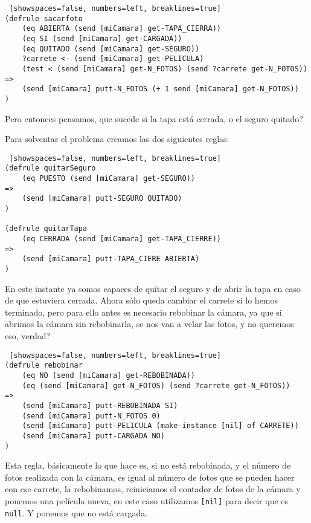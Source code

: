 \documentclass[hidelinks]{scrreprt}
\begin{document}
\begin{lstlisting} [showspaces=false, numbers=left, breaklines=true]
(defrule sacarfoto
    (eq ABIERTA (send [miCamara] get-TAPA_CIERRA))
    (eq SI (send [miCamara] get-CARGADA))
    (eq QUITADO (send [miCamara] get-SEGURO))
    ?carrete <- (send [miCamara] get-PELICULA)
    (test < (send [miCamara] get-N_FOTOS) (send ?carrete get-N_FOTOS))
=>
    (send [miCamara] putt-N_FOTOS (+ 1 send [miCamara] get-N_FOTOS))
)
\end{lstlisting}

Pero entonces pensamos, \textquestiondown que sucede si la tapa est\'{a} cerrada, o el seguro quitado?

Para solventar el problema creamos las dos siguientes reglas:
\begin{lstlisting} [showspaces=false, numbers=left, breaklines=true]
(defrule quitarSeguro
    (eq PUESTO (send [miCamara] get-SEGURO))
=>
    (send [miCamara] putt-SEGURO QUITADO)
)

(defrule quitarTapa
    (eq CERRADA (send [miCamara] get-TAPA_CIERRE))
=>
    (send [miCamara] putt-TAPA_CIERE ABIERTA)
)
\end{lstlisting}

En este instante ya somos capaces de quitar el seguro y de abrir la tapa en caso de que estuviera cerrada.
Ahora s\'{o}lo queda cambiar el carrete si lo hemos terminado, pero para ello antes es necesario rebobinar la
c\'{a}mara, ya que si abrimos la c\'{a}mara sin rebobinarla, se nos van a velar las fotos, y no queremos eso,
\textquestiondown verdad?


\begin{lstlisting} [showspaces=false, numbers=left, breaklines=true]
(defrule rebobinar
    (eq NO (send [miCamara] get-REBOBINADA))
    (eq (send [miCamara] get-N_FOTOS) (send ?carrete get-N_FOTOS))
=>
    (send [miCamara] putt-REBOBINADA SI)
    (send [miCamara] putt-N_FOTOS 0)
    (send [miCamara] putt-PELICULA (make-instance [nil] of CARRETE))
    (send [miCamara] putt-CARGADA NO)
)
\end{lstlisting}

Esta regla, b\'{a}sicamente lo que hace es, si no est\'{a} rebobinada, y el n\'{u}mero de fotos realizada con la
c\'{a}mara, es igual al n\'{u}mero de fotos que se pueden hacer con ese carrete, la rebobinamos, reiniciamos el
contador de fotos de la c\'{a}mara y ponemos una pel\'{i}cula nueva, en este caso utilizamos 
\texttt{[nil]} para decir que es \texttt{null}. Y ponemos que no est\'{a} cargada.
\end{document}
